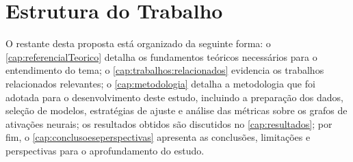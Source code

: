 \section{Estrutura do Trabalho}\label{sec:estruturaTrabalho}

O restante desta proposta está organizado da seguinte forma: o \autoref{cap:referencialTeorico} detalha os fundamentos teóricos necessários para o entendimento do tema; o \autoref{cap:trabalhos:relacionados} evidencia os trabalhos relacionados relevantes; o \autoref{cap:metodologia} detalha a metodologia que foi adotada para o desenvolvimento deste estudo, incluindo a preparação dos dados, seleção de modelos, estratégias de ajuste e análise das métricas sobre os grafos de ativações neurais; os resultados obtidos são discutidos no \autoref{cap:resultados}; por fim, o \autoref{cap:conclusoeseperspectivas} apresenta as conclusões, limitações e perspectivas para o aprofundamento do estudo.

